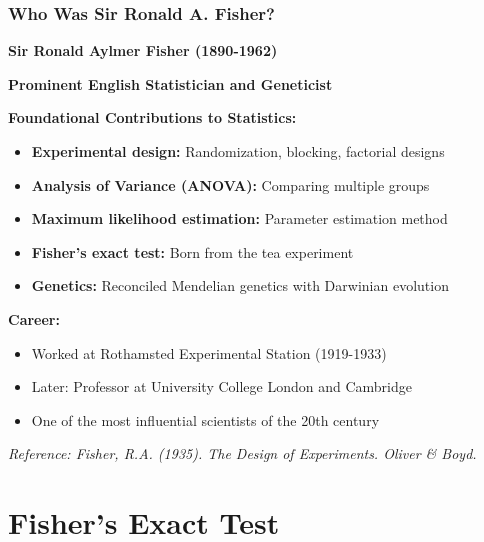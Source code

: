 \documentclass{beamer}
\begin{document}
\begin{frame}
\frametitle{Who Was Sir Ronald A. Fisher?}
\textbf{Sir Ronald Aylmer Fisher (1890-1962)}

\vspace{0.2cm}
\textbf{Prominent English Statistician and Geneticist}

\vspace{0.3cm}
\textbf{Foundational Contributions to Statistics:}
\begin{itemize}
\item \textbf{Experimental design:} Randomization, blocking, factorial designs
\item \textbf{Analysis of Variance (ANOVA):} Comparing multiple groups
\item \textbf{Maximum likelihood estimation:} Parameter estimation method
\item \textbf{Fisher's exact test:} Born from the tea experiment
\item \textbf{Genetics:} Reconciled Mendelian genetics with Darwinian evolution
\end{itemize}

\vspace{0.3cm}
\textbf{Career:}
\begin{itemize}
\item Worked at Rothamsted Experimental Station (1919-1933)
\item Later: Professor at University College London and Cambridge
\item One of the most influential scientists of the 20th century
\end{itemize}

\vspace{0.2cm}
\small{\textit{Reference: Fisher, R.A. (1935). The Design of Experiments. Oliver \& Boyd.}}
\end{frame}

\section{Fisher's Exact Test}
\end{document}
